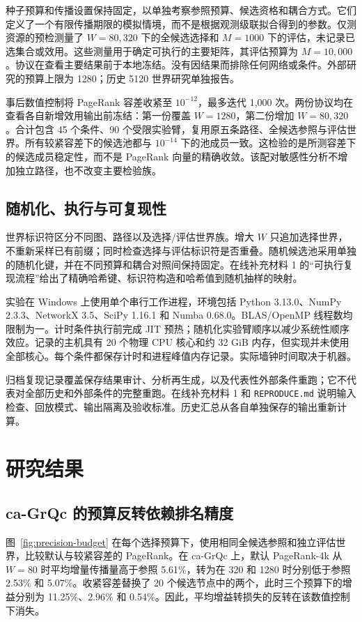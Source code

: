 \documentclass[smallextended]{svjour3}
\begin{document}
种子预算和传播设置保持固定，以单独考察参照预算、候选资格和耦合方式。它们定义了一个有限传播期限的模拟情境，而不是根据观测级联拟合得到的参数。仅测资源的预检测量了 $W=80,320$ 下的全候选选择和 $M=1000$ 下的评估，未记录已选集合或效用。这些测量用于确定可执行的主要矩阵，其评估预算为 $M=10,000$。协议在查看主要结果前于本地冻结。没有因结果而排除任何网络或条件。外部研究的预算上限为 1280；历史 5120 世界研究单独报告。

事后数值控制将 PageRank 容差收紧至 $10^{-12}$，最多迭代 1,000 次。两份协议均在查看各自新增效用输出前冻结：第一份覆盖 $W=1280$，第二份增加 $W=80,320$。合计包含 45 个条件、90 个受限实验臂，复用原五条路径、全候选参照与评估世界。所有较紧容差下的候选池都与 $10^{-14}$ 下的池成员一致。这检验的是所测容差下的候选成员稳定性，而不是 PageRank 向量的精确收敛。该配对敏感性分析不增加独立路径，也不改变主要检验族。

\subsection{随机化、执行与可复现性}
世界标识符区分不同图、路径以及选择/评估世界族。增大 $W$ 只追加选择世界，不重新采样已有前缀；同时检查选择与评估标识符是否重叠。随机候选池采用单独的随机化键，并在不同预算和耦合对照间保持固定。在线补充材料 1 的“可执行复现流程”给出了精确哈希键、标识符构造和哈希值到随机抽样的映射。

实验在 Windows 上使用单个串行工作进程，环境包括 Python 3.13.0、NumPy 2.3.3、NetworkX 3.5、SciPy 1.16.1 和 Numba 0.68.0。BLAS/OpenMP 线程数均限制为一。计时条件执行前完成 JIT 预热；随机化实验臂顺序以减少系统性顺序效应。记录的主机具有 20 个物理 CPU 核心和约 32 GiB 内存，但实现并未使用全部核心。每个条件都保存计时和进程峰值内存记录。实际墙钟时间取决于机器。

归档复现记录覆盖保存结果审计、分析再生成，以及代表性外部条件重跑；它不代表对全部历史和外部条件的完整重跑。在线补充材料 1 和 \texttt{REPRODUCE.md} 说明输入检查、回放模式、输出隔离及验收标准。历史汇总从各自单独保存的输出重新计算。

\section{研究结果}
\subsection{ca-GrQc 的预算反转依赖排名精度}
图~\ref{fig:precision-budget} 在每个选择预算下，使用相同全候选参照和独立评估世界，比较默认与较紧容差的 PageRank。在 ca-GrQc 上，默认 PageRank-4k 从 $W=80$ 时平均增量传播量高于参照 5.61\%，转为在 320 和 1280 时分别低于参照 2.53\% 和 5.07\%。收紧容差替换了 20 个候选节点中的两个，此时三个预算下的增益分别为 11.25\%、2.96\% 和 0.54\%。因此，平均增益转损失的反转在该数值控制下消失。
\end{document}
